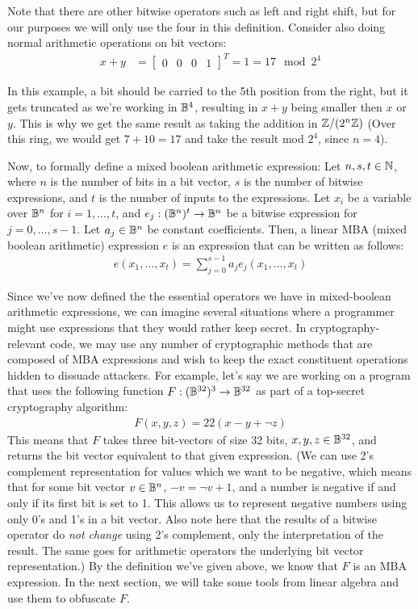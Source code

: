 Note that there are other bitwise operators such as left and right shift, but for our
purposes we will only use the four in this definition. Consider also doing normal arithmetic operations on bit vectors:
\begin{align*}
x + y &= \begin{bmatrix}
0 & 0 & 0 & 1 
\end{bmatrix}^T = 1 = 17 \mod 2^4 
\end{align*}
\par In this example, a bit should be carried to
the 5th position from the right, but it gets truncated as we're working in $\mathbb{B}^4$, resulting
in $x + y$ being smaller then $x$ or $y$. 
This is why we get the same result as taking the addition in
$\mathbb{Z}/(2^n\mathbb{Z})$ (Over this ring, we would get $7 + 10 = 17$ and take the result mod $2^4$, 
since $n=4$).
\par Now, to formally define a mixed boolean arithmetic expression:
 {Let $n,s,t \in \mathbb{N}$, where $n$ is the number of bits in a bit vector, 
$s$ is the number of bitwise expressions, and $t$ is the number of 
inputs to the expressions.
Let $x_i$ be a variable over $\mathbb{B}^n$ for
$i = 1,...,t$, and $e_j : (\mathbb{B}^n)^t \rightarrow \mathbb{B}^n$ be a bitwise expression for
$j = 0,...,s-1$. Let $a_j\in \mathbb{B}^n$ be constant coefficients.
Then, a linear MBA (mixed boolean arithmetic) expression $e$ is an expression that can be written as follows:
\begin{align*}
    e(x_1, ..., x_t) = \sum_{j=0}^{s-1} a_j e_j(x_1,...,x_t)
\end{align*}
}
\par Since we've now defined the the essential operators we have in mixed-boolean 
arithmetic
expressions, we can imagine several situations where a programmer might use expressions 
that they would rather keep secret. In cryptography-relevant code, we may use any
number of cryptographic methods that are composed of MBA 
expressions
and wish to keep the exact constituent operations hidden 
to dissuade attackers. For example, let's say we are working on a 
program that uses the following function $F : (\mathbb{B}^{32})^3 \rightarrow \mathbb{B}^{32}$ as part
of a top-secret cryptography algorithm:
\begin{align*}
    F(x, y, z) = 22(x - y + \neg z)
\end{align*}
This means  that $F$ takes three bit-vectors of size 32 bits, $x, y, z \in \mathbb{B}^{32}$, 
and returns the bit vector equivalent to that given expression. 
(We can use 2's complement representation for values which we want to be negative,
which means that for some bit vector $v \in \mathbb{B}^n$, $-v = \neg v + 1$,
and a number is negative if and only if its first bit is set to 1.
This allows us to represent negative numbers using only 0's and 1's in a bit vector. 
Also note here that the results of a bitwise operator do {\itshape not change} 
using 2's complement, only the  interpretation of the result. The same goes for 
arithmetic operators the underlying bit vector representation.)
By the definition we've given above, we know that $F$ is an MBA expression. 
In the next section, 
we will take some tools from linear algebra and use them to obfuscate $F$.
